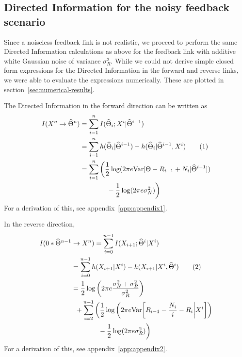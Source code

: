 \documentclass[conference]{IEEEtran}
\newcommand\numberthis{\stepcounter{equation}\tag{\theequation}}
\begin{document}
\subsection{Directed Information for the noisy feedback scenario}

Since a noiseless feedback link is not realistic, we proceed to perform the same Directed Information calculations as above for the feedback link with additive white Gaussian noise of variance $\sigma_R^2$. While we could not derive simple closed form expressions for the Directed Information in the forward and reverse links, we were able to evaluate the expressions numerically. These are plotted in section~\ref{sec:numerical-results}.

The Directed Information in the forward direction can be written as
\begin{align*}
	I(X^n \rightarrow \widehat\Theta^n) &= \sum_{i=1}^n{I(\widehat\Theta_i ; X^i | \widehat\Theta^{i-1})} \\
										&= \sum_{i=1}^n{h(\widehat\Theta_i | \widehat\Theta^{i-1}) - h(\widehat\Theta_i | \widehat\Theta^{i-1}, X^i)} \numberthis \label{eq:dir-info-fwd-noisy} \\
										&= \sum_{i=1}^n \bigg( \frac{1}{2} \log(2 \pi e \text{Var}[\Theta - R_{i-1} + N_i | \widehat\Theta^{i-1}]) \\
										& \qquad \qquad - \frac{1}{2}\log(2 \pi e \sigma_N^2) \bigg)
\end{align*}
For a derivation of this, see appendix~\ref{app:appendix1}.

In the reverse direction,
\begin{align*}
	I(0*\widehat\Theta^{n-1} & \rightarrow X^n) = \sum_{i=0}^{n-1}{I(X_{i+1}; \widehat\Theta^i | X^i)} \\
							 &= \sum_{i=0}^{n-1}{h(X_{i+1} | X^i) - h(X_{i+1} | X^i, \widehat\Theta^i)} \numberthis \label{eq:dir-info-rev-noisy} \\
							 &= \frac{1}{2} \log \bigg( 2 \pi e \frac{\sigma_N^2 + \sigma_R^2}{\sigma_R^2} \bigg) \\
							 & \; \; + \sum_{i=2}^{n-1} \bigg( \frac{1}{2} \log \bigg( 2 \pi e \text{Var} \bigg[ R_{i-1} - \frac{N_i}{i} - R_i \bigg| X^i \bigg] \bigg) \\
							 & \qquad \qquad - \frac{1}{2} \log( 2 \pi e \sigma_R^2 ) \bigg)
\end{align*}
For a derivation of this, see appendix~\ref{app:appendix2}.

\end{document}
